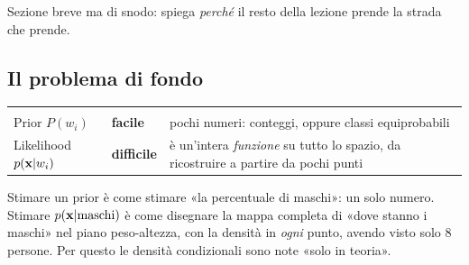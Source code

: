 
Sezione breve ma di snodo: spiega \emph{perché} il resto della lezione prende la strada che prende.

\subsection{Il problema di fondo}
\begin{center}
\begin{tabularx}{\linewidth}{l l Y}
 &  & \\
Prior $P(w_i)$ & \textcolor{verde}{\textbf{facile}} & pochi numeri: conteggi, oppure classi equiprobabili\\
Likelihood $p(\mathbf{x}|w_i)$ & \textcolor{rosso}{\textbf{difficile}} & è un'intera \emph{funzione} su tutto lo spazio, da ricostruire a partire da pochi punti\\
\end{tabularx}
\end{center}
\begin{intuizione}
Stimare un prior è come stimare «la percentuale di maschi»: un solo numero. Stimare $p(\mathbf{x}|\text{maschi})$ è come disegnare la mappa completa di «dove stanno i maschi» nel piano peso-altezza, con la densità in \emph{ogni} punto, avendo visto solo 8 persone. Per questo le densità condizionali sono note «solo in teoria».
\end{intuizione}

